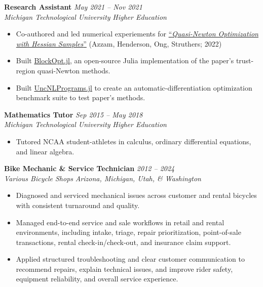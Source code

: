 \documentclass[10pt,letterpaper]{article}
\newcommand{\resumeItem}[1]{\item \small #1}
\newcommand{\resumeLink}[2]{\href{#1}{#2}}
\newcommand{\resumeSubheading}[4]{%
  \textbf{#1} \hfill \small{\textit{#2}}\\
  \small{\textit{#3}} \hfill \small{\textit{#4}}\par
}
\begin{document}
\resumeSubheading{Research Assistant}{May 2021 -- Nov 2021}{Michigan Technological University}{Higher Education}
\begin{itemize}
  \resumeItem{Co-authored and led numerical experiements for \resumeLink{https://arxiv.org/abs/2201.02608}{``\emph{Quasi-Newton Optimization with Hessian Samples}''} (Azzam, Henderson, Ong, Struthers; 2022)}
  \resumeItem{Built \resumeLink{https://github.com/danphenderson/BlockOpt.jl}{BlockOpt.jl}, an open-source Julia implementation of the paper's trust-region quasi-Newton methods.}
  \resumeItem{Built \resumeLink{https://github.com/danphenderson/UncNLPrograms.jl}{UncNLPrograms.jl} to create an automatic-differentiation optimization benchmark suite to test paper's methods.}
\end{itemize}

\resumeSubheading{Mathematics Tutor}{Sep 2015 -- May 2018}{Michigan Technological University}{Higher Education}
\begin{itemize}
  \resumeItem{Tutored NCAA student-athletes in calculus, ordinary differential equations, and linear algebra.}
\end{itemize}

\resumeSubheading{Bike Mechanic \& Service Technician}{2012 -- 2024}{Various Bicycle Shops}{Arizona, Michigan, Utah, \& Washington}
\begin{itemize}
    \item Diagnosed and serviced mechanical issues across customer and rental bicycles with consistent turnaround and quality.
    \item Managed end-to-end service and sale workflows in retail and rental environments, including intake, triage, repair prioritization, point-of-sale transactions, rental check-in/check-out, and insurance claim support.
    \item Applied structured troubleshooting and clear customer communication to recommend repairs, explain technical issues, and improve rider safety, equipment reliability, and overall service experience.
\end{itemize}

\newpage
\end{document}
